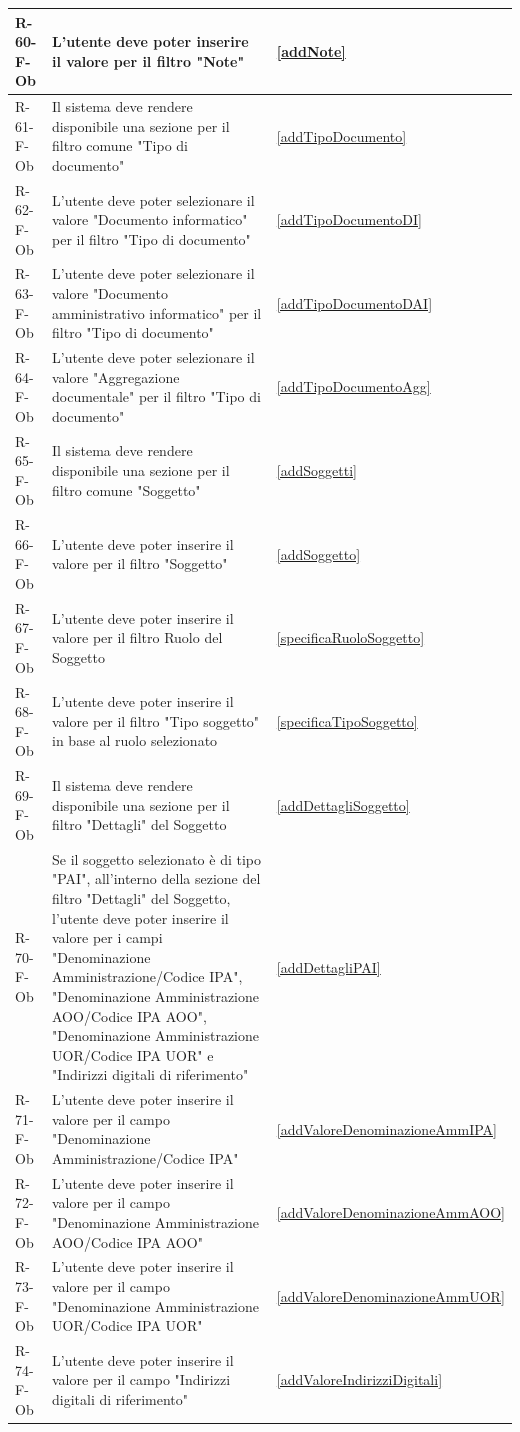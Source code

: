 \begin{longtable}{|p{2.5cm}|p{9.5cm}|p{2.5cm}|}
\hline
R-60-F-Ob & L'utente deve poter inserire il valore per il filtro "Note" & \ref{addNote} \\
\hline
R-61-F-Ob & Il sistema deve rendere disponibile una sezione per il filtro comune "Tipo di documento" & \ref{addTipoDocumento} \\
\hline
R-62-F-Ob & L'utente deve poter selezionare il valore "Documento informatico" per il filtro "Tipo di documento" & \ref{addTipoDocumentoDI} \\
\hline
R-63-F-Ob & L'utente deve poter selezionare il valore "Documento amministrativo informatico" per il filtro "Tipo di documento" & \ref{addTipoDocumentoDAI} \\
\hline
R-64-F-Ob & L'utente deve poter selezionare il valore "Aggregazione documentale" per il filtro "Tipo di documento" & \ref{addTipoDocumentoAgg} \\
\hline
R-65-F-Ob & Il sistema deve rendere disponibile una sezione per il filtro comune "Soggetto" & \ref{addSoggetti} \\
\hline
R-66-F-Ob & L'utente deve poter inserire il valore per il filtro "Soggetto" & \ref{addSoggetto} \\
\hline
R-67-F-Ob & L'utente deve poter inserire il valore per il filtro Ruolo del Soggetto & \ref{specificaRuoloSoggetto} \\
\hline
R-68-F-Ob & L'utente deve poter inserire il valore per il filtro "Tipo soggetto" in base al ruolo selezionato & \ref{specificaTipoSoggetto} \\
\hline

R-69-F-Ob & Il sistema deve rendere disponibile una sezione per il filtro "Dettagli" del Soggetto & \ref{addDettagliSoggetto} \\
\hline
R-70-F-Ob & Se il soggetto selezionato è di tipo "PAI", all'interno della sezione del filtro "Dettagli" del Soggetto, l'utente deve poter inserire il valore per i campi "Denominazione Amministrazione/Codice IPA", "Denominazione Amministrazione AOO/Codice IPA AOO", "Denominazione Amministrazione UOR/Codice IPA UOR" e "Indirizzi digitali di riferimento" & \ref{addDettagliPAI} \\
\hline
R-71-F-Ob & L'utente deve poter inserire il valore per il campo "Denominazione Amministrazione/Codice IPA" & \ref{addValoreDenominazioneAmmIPA} \\
\hline
R-72-F-Ob & L'utente deve poter inserire il valore per il campo "Denominazione Amministrazione AOO/Codice IPA AOO" & \ref{addValoreDenominazioneAmmAOO} \\
\hline
R-73-F-Ob & L'utente deve poter inserire il valore per il campo "Denominazione Amministrazione UOR/Codice IPA UOR" & \ref{addValoreDenominazioneAmmUOR} \\
\hline
R-74-F-Ob & L'utente deve poter inserire il valore per il campo "Indirizzi digitali di riferimento" & \ref{addValoreIndirizziDigitali} \\


\end{longtable}
